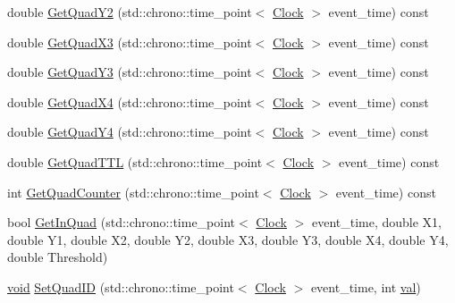 \begin{DoxyCompactItemize}
\item 
double \mbox{\hyperlink{class_quad_a8f10730993f6c6310f18431a81fb352a}{Get\+Quad\+Y2}} (std\+::chrono\+::time\+\_\+point$<$ \mbox{\hyperlink{universe_8h_a0ef8d951d1ca5ab3cfaf7ab4c7a6fd80}{Clock}} $>$ event\+\_\+time) const
\item 
double \mbox{\hyperlink{class_quad_aaa044d9683717efd054d82f553b3337d}{Get\+Quad\+X3}} (std\+::chrono\+::time\+\_\+point$<$ \mbox{\hyperlink{universe_8h_a0ef8d951d1ca5ab3cfaf7ab4c7a6fd80}{Clock}} $>$ event\+\_\+time) const
\item 
double \mbox{\hyperlink{class_quad_a9cdb9ea12e3aa3eb0e471015d4cb46bb}{Get\+Quad\+Y3}} (std\+::chrono\+::time\+\_\+point$<$ \mbox{\hyperlink{universe_8h_a0ef8d951d1ca5ab3cfaf7ab4c7a6fd80}{Clock}} $>$ event\+\_\+time) const
\item 
double \mbox{\hyperlink{class_quad_a07884076387e255aa09ca8b0ac7ff599}{Get\+Quad\+X4}} (std\+::chrono\+::time\+\_\+point$<$ \mbox{\hyperlink{universe_8h_a0ef8d951d1ca5ab3cfaf7ab4c7a6fd80}{Clock}} $>$ event\+\_\+time) const
\item 
double \mbox{\hyperlink{class_quad_aff3097e4988549376102daf18b582a0b}{Get\+Quad\+Y4}} (std\+::chrono\+::time\+\_\+point$<$ \mbox{\hyperlink{universe_8h_a0ef8d951d1ca5ab3cfaf7ab4c7a6fd80}{Clock}} $>$ event\+\_\+time) const
\item 
double \mbox{\hyperlink{class_quad_ab17ff4d689675e80107ecf6588811eee}{Get\+Quad\+T\+TL}} (std\+::chrono\+::time\+\_\+point$<$ \mbox{\hyperlink{universe_8h_a0ef8d951d1ca5ab3cfaf7ab4c7a6fd80}{Clock}} $>$ event\+\_\+time) const
\item 
int \mbox{\hyperlink{class_quad_a56ac193fa18af6ec468463cc16588cc1}{Get\+Quad\+Counter}} (std\+::chrono\+::time\+\_\+point$<$ \mbox{\hyperlink{universe_8h_a0ef8d951d1ca5ab3cfaf7ab4c7a6fd80}{Clock}} $>$ event\+\_\+time) const
\item 
bool \mbox{\hyperlink{class_quad_a80c2eb7c282e1566c5f7f235611b6206}{Get\+In\+Quad}} (std\+::chrono\+::time\+\_\+point$<$ \mbox{\hyperlink{universe_8h_a0ef8d951d1ca5ab3cfaf7ab4c7a6fd80}{Clock}} $>$ event\+\_\+time, double X1, double Y1, double X2, double Y2, double X3, double Y3, double X4, double Y4, double Threshold)
\item 
\mbox{\hyperlink{glad_8h_a950fc91edb4504f62f1c577bf4727c29}{void}} \mbox{\hyperlink{class_quad_a9900acc75445ebc71aba2307e3fe0131}{Set\+Quad\+ID}} (std\+::chrono\+::time\+\_\+point$<$ \mbox{\hyperlink{universe_8h_a0ef8d951d1ca5ab3cfaf7ab4c7a6fd80}{Clock}} $>$ event\+\_\+time, int \mbox{\hyperlink{glad_8h_a26942fd2ed566ef553eae82d2c109c8f}{val}})

\end{DoxyCompactItemize}
